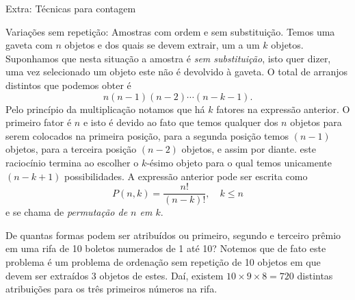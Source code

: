 \begin{frame}
\vspace{4cm}
\begin{block}{Extra: Técnicas para contagem }
	{}
\end{block}
\end{frame}
\begin{frame}{Variações sem repetição: Amostras com ordem e sem substituição.} Temos uma gaveta com $n$ objetos e dos quais se devem extrair, um a um $k$ objetos. Suponhamos que nesta situação a amostra é {\it sem substituição}, isto quer dizer, uma vez selecionado um  objeto este não é devolvido à gaveta. O total de arranjos distintos que podemos obter é 
\begin{equation}
\label{perm1}
n(n-1)(n-2)\cdots (n-k-1). 
\end{equation}
Pelo princípio da multiplicação notamos que há $k$ fatores na expressão anterior. O primeiro fator é $n$ e isto é devido ao fato que temos qualquer dos $n$ objetos para serem colocados na primeira posição, para a segunda posição temos $(n-1)$ objetos, para a terceira posição $(n-2)$ objetos, e assim por diante. este raciocínio termina ao escolher o $k$-ésimo objeto para o qual temos unicamente $(n-k+1)$ possibilidades. A expressão anterior pode ser escrita como 
$$
P(n,k) = \frac{n!}{(n-k)!}, \quad k \leq n
$$ 
e se chama de {\it permutação de $n$ em $k$}. 
\begin{exem}
De quantas formas podem ser atribuídos ou primeiro, segundo e terceiro prêmio em uma rifa de 10 boletos numerados de 1 até 10? Notemos que de fato este problema é um problema de ordenação sem repetição de 10 objetos em que devem ser extraídos 3 objetos de estes. Daí, existem $10\times 9\times 8=720 $ distintas atribuições para os três primeiros números na rifa. 
\end{exem}


\end{frame}


